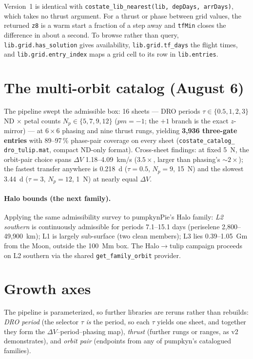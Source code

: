 \documentclass[11pt]{article}
\begin{document}
Version~1 is identical with \texttt{costate\_lib\_nearest(lib, depDays,
arrDays)}, which takes no thrust argument. For a thrust or phase between grid
values, the returned \texttt{z8} is a warm start a fraction of a step away and
\texttt{tfMin} closes the difference in about a second. To browse rather than
query, \texttt{lib.grid.has\_solution} gives availability,
\texttt{lib.grid.tf\_days} the flight times, and
\texttt{lib.grid.entry\_index} maps a grid cell to its row in
\texttt{lib.entries}.

\section{The multi-orbit catalog (August 6)}

The pipeline swept the admissible box: 16 sheets --- DRO periods
$\tau \in \{0.5, 1, 2, 3\}$ ND $\times$ petal counts $N_p \in \{5,7,9,12\}$
($pm=-1$; the $+1$ branch is the exact $z$-mirror) --- at $6\times6$ phasing
and nine thrust rungs, yielding \textbf{3{,}936 three-gate entries} with
89--97\,\% phase-pair coverage on every sheet (\texttt{costate\_catalog\_%
dro\_tulip.mat}, compact ND-only format). Cross-sheet findings: at fixed
5~N, the orbit-pair choice spans $\Delta V$ 1.18--4.09~km/s ($3.5\times$,
larger than phasing's $\sim2\times$); the fastest transfer anywhere is
0.218~d ($\tau=0.5$, $N_p=9$, 15~N) and the slowest 3.44~d ($\tau=3$,
$N_p=12$, 1~N) at nearly equal $\Delta V$.

\paragraph{Halo bounds (the next family).} Applying the same admissibility
survey to pumpkynPie's Halo family: \emph{L2 southern} is continuously
admissible for periods 7.1--15.1 days (periselene 2{,}800--49{,}900~km);
L1 is largely sub-surface (two clean members); L3 lies 0.39--1.05~Gm from
the Moon, outside the 100~Mm box. The Halo$\to$tulip campaign proceeds on
L2 southern via the shared \texttt{get\_family\_orbit} provider.

\section{Growth axes}

The pipeline is parameterized, so further libraries are reruns rather than
rebuilds: \emph{DRO period} (the selector $\tau$ \emph{is} the period, so each
$\tau$ yields one sheet, and together they form the $\Delta V$--period--phasing
map), \emph{thrust} (further rungs or ranges, as v2 demonstrates), and
\emph{orbit pair} (endpoints from any of pumpkyn's catalogued families).
\end{document}
